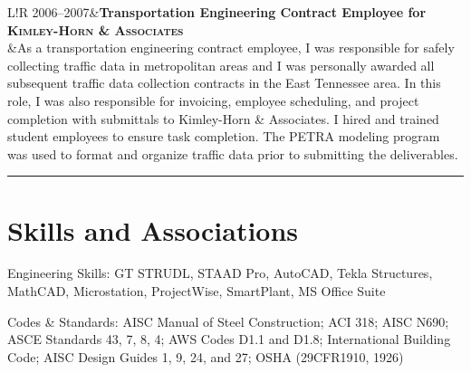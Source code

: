 \documentclass[11pt,letterpaper]{article}
\newcommand\VRule{\color{lightgray}\vrule width 0.5pt}
\begin{document}
\begin{tabular}{L!{\VRule}R}
2006--2007&{\bf Transportation Engineering Contract Employee for \fontsize{12}{12}\textsc{Kimley-Horn \& Associates}}\\
&As a transportation engineering contract employee, I was responsible for safely collecting traffic data in metropolitan areas and I was personally awarded all subsequent traffic data collection contracts in the East Tennessee area.  In this role, I was also responsible for invoicing, employee scheduling, and project completion with submittals to Kimley-Horn \& Associates.  I hired and trained student employees to ensure task completion.  The PETRA modeling program was used to format and organize traffic data prior to submitting the deliverables.  
\end{tabular}
\vspace{1em} 
\hrule
\vspace{-0.4em}

\section*{Skills and Associations}

\begin{description*}
	\item[Engineering Skills:]
	GT STRUDL, STAAD Pro, AutoCAD, Tekla Structures, MathCAD, Microstation, ProjectWise, SmartPlant, MS Office Suite
	\\[5pt]
	\item[Codes \& Standards:]
	AISC Manual of Steel Construction; ACI 318; AISC N690; ASCE Standards 43, 7, 8, 4; AWS Codes D1.1 and D1.8; International Building Code; AISC Design Guides 1, 9, 24, and 27; OSHA (29CFR1910, 1926)
	\end{description*}
\end{document}
